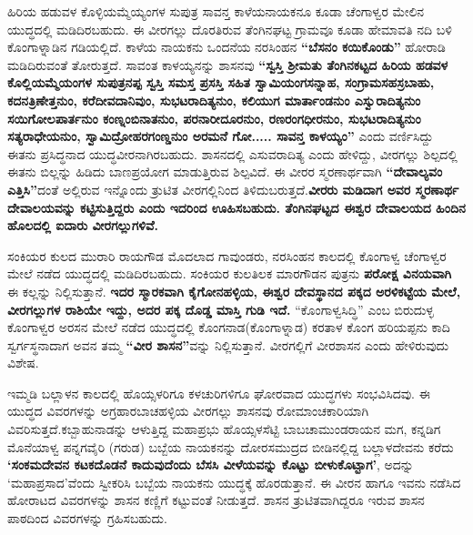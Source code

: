 ಹಿರಿಯ ಹಡುವಳ ಕೊಳ್ಳಿಯಮ್ಮೆಯ್ಯಂಗಳ ಸುಪುತ್ರ ಸಾವನ್ತ ಕಾಳೆಯನಾಯಕನೂ ಕೂಡಾ ಚೆಂಗಾಳ್ವರ ಮೇಲಿನ ಯುದ್ಧದಲ್ಲಿ ಮಡಿದಿರಬಹುದು. ಈ ವೀರಗಲ್ಲು ದೊರತಿರುವ ತೆಂಗಿನಘಟ್ಟ ಗ್ರಾಮವೂ ಕೂಡಾ ಹೇಮಾವತಿ ನದಿ ಬಳಿ ಕೊಂಗಾಳ್ನಾಡಿನ ಗಡಿಯಲ್ಲಿದೆ. ಕಾಳೆಯ ನಾಯಕನು ಒಂದನೆಯ ನರಸಿಂಹನ \textbf{“ಬೆಸನಂ ಕಯಿಕೊಂಡು”} ಹೋರಾಡಿ ಮಡಿದಿರುವಂತೆ ತೋರುತ್ತದೆ. ಸಾವಂತ ಕಾಳಯ್ಯನನ್ನು ಶಾಸನವು \textbf{“ಸ್ವಸ್ತಿ ಶ‍್ರೀಮತು ತೆಂಗಿನಕಟ್ಟದ ಹಿರಿಯ ಹಡವಳ ಕೊಲ್ಲಿಯಮ್ಮೆಯಂಗಳ ಸುಪುತ್ರನಪ್ಪ ಸ್ವಸ್ತಿ ಸಮಸ್ತ ಪ್ರಸಸ್ತಿ ಸಹಿತ ಸ್ವಾಮಿಯಂಗಸನ್ನಾಹ, ಸಂಗ್ರಾಮಸಹಸ್ರಬಾಹು, ಕದನತ್ರಿಣೇತ್ತನುಂ, ಕರೆದೀವದಾನಿವುಂ, ಸುಭಟರಾದಿತ್ಯನುಂ, ಕಲಿಯುಗ ಮಾರ್ತಾಂಡನುಂ ಎಸ್ವುರಾದಿತ್ಯನುಂ ಸಯಿಗೋಲಪಾರ್ತನುಂ\general{\break } ಕಂಣ್ನಂಬಿನಾತನುಂ, ಪರನಾರೀದೂರನುಂ, ರಣರಂಗಧೀರನುಂ, ಸುಭಟರಾದಿತ್ಯನುಂ ಸತ್ಯರಾಧೇಯನುಂ, ಸ್ವಾಮಿದ್ರೋಹ\-ರಗಂಣ್ಡನುಂ ಅರಮನೆ ಗೋ..... ಸಾವನ್ತ ಕಾಳಯ್ಯಂ”} ಎಂದು ವರ್ಣಿಸಿದ್ದು ಈತನು ಪ್ರಸಿದ್ಧನಾದ ಯುದ್ಧವೀರನಾಗಿರಬಹುದು. ಶಾಸನದಲ್ಲಿ ಎಸುವರಾದಿತ್ಯ ಎಂದು ಹೇಳಿದ್ದು, ವೀರಗಲ್ಲು ಶಿಲ್ಪದಲ್ಲಿ ಈತನು ಬಿಲ್ಲನ್ನು ಹಿಡಿದು ಬಾಣಪ್ರಯೋಗ ಮಾಡುತ್ತಿರುವ ಶಿಲ್ಪವಿದೆ. ಈ ವೀರರ ಸ್ಮರಣಾರ್ಥವಾಗಿ \textbf{“ದೇವಾಲ್ಯವಂ ಎತ್ತಿಸಿ”}ದಂತೆ ಅಲ್ಲಿರುವ ಇನ್ನೊಂದು ತ್ರುಟಿತ ವೀರಗಲ್ಲಿನಿಂದ ತಿಳಿದುಬರುತ್ತದೆ.\textbf{ವೀರರು ಮಡಿದಾಗ ಅವರ ಸ್ಮರಣಾರ್ಥ ದೇವಾಲಯವನ್ನು ಕಟ್ಟಿಸುತ್ತಿದ್ದರು ಎಂದು ಇದರಿಂದ ಊಹಿಸ\-ಬಹುದು. ತೆಂಗಿನಘಟ್ಟದ ಈಶ್ವರ ದೇವಾಲಯದ ಹಿಂದಿನ ಹೊಲದಲ್ಲಿ ಐದಾರು ವೀರಗಲ್ಲುಗಳಿವೆ.}

ಸಂಕಿಯರ ಕುಲದ ಮುರಾರಿ ರಾಯಗೌಡ ಮೊದಲಾದ ಗಾವುಂಡರು, ನರಸಿಂಹನ ಕಾಲದಲ್ಲಿ ಕೊಂಗಾಳ್ವ ಚೆಂಗಾಳ್ವರ ಮೇಲೆ ನಡೆದ ಯುದ್ಧದಲ್ಲಿ ಮಡಿದಿರಬಹುದು. ಸಂಕಿಯರ ಕುಲತಿಲಕ ಮಾರಗೌಡನ ಪುತ್ರನು \textbf{ಪರೋಕ್ಷ ವಿನಯವಾಗಿ} ಈ ಕಲ್ಲನ್ನು ನಿಲ್ಲಿಸುತ್ತಾನೆ. \textbf{ಇದರ ಸ್ಮಾರಕವಾಗಿ ಕೈಗೋನಹಳ್ಳಿಯ, ಈಶ್ವರ ದೇವಸ್ಥಾನದ ಪಕ್ಕದ ಅರಳಿಕಟ್ಟೆಯ ಮೇಲೆ, ವೀರಗಲ್ಲುಗಳ ರಾಶಿಯೇ ಇದ್ದು, ಅದರ ಪಕ್ಕ ದೊಡ್ಡ ಮಾಸ್ತಿ ಗುಡಿ ಇದೆ.} “ಕೊಂಗಾಳ್ವಸಿದ್ಧಿ” ಎಂಬ ಬಿರುದುಳ್ಳ ಕೊಂಗಾಳ್ವರ ಅರಸನ ಮೇಲೆ ನಡೆದ ಯುದ್ಧದಲ್ಲಿ ಕೊಂಗನಾಡ(ಕೊಂಗಾಳ್ನಾಡ) ಕರತಾಳ ಕೊಂಗ ಹರಿಯಪ್ಪನು ಕಾದಿ ಸ್ವರ್ಗಸ್ಥನಾದಾಗ ಅವನ ತಮ್ಮ \textbf{“ವೀರ ಶಾಸನ”}ವನ್ನು ನಿಲ್ಲಿಸುತ್ತಾನೆ. ವೀರಗಲ್ಲಿಗೆ ವೀರಶಾಸನ ಎಂದು ಹೇಳಿರುವುದು ವಿಶೇಷ.

ಇಮ್ಮಡಿ ಬಲ್ಲಾಳನ ಕಾಲದಲ್ಲಿ ಹೊಯ್ಸಳರಿಗೂ ಕಳಚುರಿಗಳಿಗೂ ಘೋರವಾದ ಯುದ್ಧಗಳು ಸಂಭವಿಸಿದವು. ಈ ಯುದ್ಧದ ವಿವರಗಳನ್ನು ಅಗ್ರಹಾರಬಾಚಹಳ್ಳಿಯ ವೀರಗಲ್ಲು ಶಾಸನವು ರೋಮಾಂಚಕಾರಿಯಾಗಿ ವಿವರಿಸುತ್ತದೆ.\break ಕಬ್ಬಾಹುನಾಡನ್ನು ಆಳುತ್ತಿದ್ದ ಮಹಾಪ್ರಭು ಹೊಯ್ಸಳಸೆಟ್ಟಿ ಬಾಬಚಾಮುಂಡರಾಯನ ಮಗ, ಕನ್ನಡಿಗ ಮೊನೆಯಾಳ್ವ ಪನ್ನಗವೈರಿ (ಗರುಡ) ಬಬ್ಬೆಯ ನಾಯಕನನ್ನು ದೋರಸಮುದ್ರದ ಬೀಡಿನಲ್ಲಿದ್ದ ಬಲ್ಲಾಳದೇವನು ಕರೆದು \textbf{‘ಸಂಕಮದೇವನ ಕಟಕದೊಡನೆ ಕಾದುವುದೆಂದು ಬೆಸಸಿ ವೀಳೆಯವನ್ನು ಕೊಟ್ಟು ಬೀಳುಕೊಟ್ಟಾಗ’}, ಅದನ್ನು ‘ಮಹಾಪ್ರಸಾದ’ವೆಂದು ಸ್ವೀಕರಿಸಿ ಬಬ್ಬೆಯ ನಾಯಕನು ಯುದ್ಧಕ್ಕೆ ಹೊರಡುತ್ತಾನೆ. ಈ ವೀರನ ಹಾಗೂ ಇವನು ನಡೆಸಿದ ಹೋರಾಟದ ವಿವರಗಳನ್ನು ಶಾಸನ ಕಣ್ಣಿಗೆ ಕಟ್ಟುವಂತೆ ನೀಡುತ್ತದೆ. ಶಾಸನ ತ್ರುಟಿತವಾಗಿದ್ದರೂ ಇರುವ ಶಾಸನ ಪಾಠದಿಂದ ವಿವರಗಳನ್ನು ಗ್ರಹಿಸಬಹುದು.

